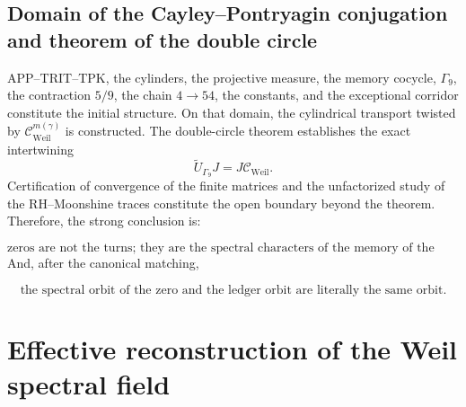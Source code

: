 \subsection{Domain of the Cayley--Pontryagin conjugation and theorem of the double circle}
APP–TRIT–TPK, the cylinders, the projective measure, the memory cocycle, \(\Gamma_9\), the contraction \(5/9\), the chain \(4\to54\), the constants, and the exceptional corridor constitute the initial structure. On that domain, the cylindrical transport twisted by \(\mathcal C_{\mathrm{Weil}}^{m(\gamma)}\) is constructed. The double-circle theorem establishes the exact intertwining
  \[
  \widetilde U_{\Gamma_9}J
  =
  J\mathcal C_{\mathrm{Weil}}.
  \]
Certification of convergence of the finite matrices and the unfactorized study of the RH–Moonshine traces constitute the open boundary beyond the theorem.
Therefore, the strong conclusion is:\par
\[
\boxed{
\text{zeros are not the turns;
they are the spectral characters of the memory of the turns.}
}
\]
And, after the canonical matching,\par
\[
\boxed{
\text{the spectral orbit of the zero and the ledger orbit are literally the same orbit.}
}
\]

\section{Effective reconstruction of the Weil spectral field}
